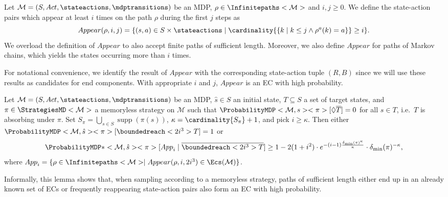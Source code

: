 \documentclass{theoretics}
\newcommand{\UnionSym}{\bigcup}
\newcommand{\Union}{\UnionSym}
\newcommand{\MDP}{\mathcal{M}}
\newcommand{\States}{S}
\newcommand{\initialstate}{\hat{s}}
\newcommand{\Actions}{Act}
\newcommand{\infinitepath}{\rho}
\newcommand{\strategy}{\pi}
\DeclareMathOperator{\support}{supp}
\newcommand{\reach}{\Diamond}
\newcommand{\targetset}{T}
\begin{document}
\newcommand{\appear}{Appear}

\begin{definition}
	Let $\MDP = (\States, \Actions, \stateactions, \mdptransitions)$ be an MDP, $\infinitepath \in \Infinitepaths<\MDP>$ and $i, j \geq 0$.
	We define the state-action pairs which appear at least $i$ times on the path $\infinitepath$ during the first $j$ steps as
	\begin{equation*}
		\appear(\infinitepath, i, j) = \{(s, a) \in \States \times \stateactions \mid \cardinality{\{k \mid k \leq j \land \infinitepath^a(k) = a\}} \geq i\}.
	\end{equation*}
	We overload the definition of $\appear$ to also accept finite paths of sufficient length.
	Moreover, we also define $\appear$ for paths of Markov chains, which yields the states occurring more than $i$ times.
\end{definition}
For notational convenience, we identify the result of $\appear$ with the corresponding state-action tuple $(R, B)$ since we will use these results as candidates for end components.
With appropriate $i$ and $j$, $\appear$ is an EC with high probability.
\begin{lemma} \label{stm:dql:appear_is_ec_probability}
	Let $\MDP = (\States, \Actions, \stateactions, \mdptransitions)$ be an MDP, $\initialstate \in \States$ an initial state, $\targetset \subseteq \States$ a set of target states, and $\strategy \in \StrategiesMD<\MDP>$ a memoryless strategy on $\MDP$ such that $\ProbabilityMDP<\MDP, s><\strategy>[\reach \overline{\targetset}] = 0$ for all $s \in \targetset$, i.e.\ $\targetset$ is absorbing under $\strategy$.
	Set $\States_\strategy = \Union_{s \in \States} \support(\strategy(s))$, $\kappa = \cardinality{\States_\strategy} + 1$, and pick $i \geq \kappa$.
	Then either $\ProbabilityMDP<\MDP, \initialstate><\strategy>[\boundedreach<2i^3> T] = 1$ or
	\begin{equation*}
		\ProbabilityMDP*<\MDP, \initialstate><\strategy>[{App}_i \mid \overline{\boundedreach<2i^3> T}] \geq 1 - 2 (1 + i^2) \cdot e^{- (i - 1) \frac{\delta_{\min}(\strategy)^\kappa}{\kappa}} \cdot \delta_{\min}(\strategy)^{-\kappa},
	\end{equation*}
	where ${App}_i = \{\infinitepath \in \Infinitepaths<\MDP> \mid \appear(\infinitepath, i, 2i^3) \in \Ecs(\MDP)\}$.
\end{lemma}
Informally, this lemma shows that, when sampling according to a memoryless strategy, paths of sufficient length either end up in an already known set of ECs or frequently reappearing state-action pairs also form an EC with high probability.
\end{document}
